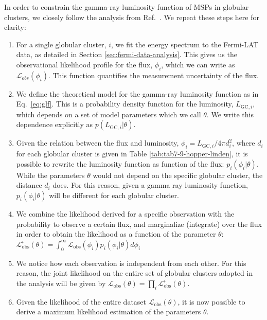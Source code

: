 \documentclass[a4paper,11pt]{article}
\begin{document}
In order to constrain the gamma-ray luminosity function of MSPs in globular clusters, we closely follow the analysis from Ref.~\cite{Hooper:2016rap}. 
We repeat these steps here for clarity:
\begin{enumerate}
    \item For a single globular cluster, $i$, we fit the energy spectrum to the Fermi-LAT data, as detailed in Section \ref{sec:fermi-data-analysis}. This gives us the observational likelihood profile for the flux, $\phi_i$, which we can write as $\mathcal{L}_{obs}(\phi_i)$. This function quantifies the measurement uncertainty of the flux.
    \item  We define the theoretical model for the gamma-ray luminosity function as in Eq.~\ref{eq:glf}. This is a probability density function  for the luminosity, $L_{\textrm{GC}, i}$, which depends on a set of model parameters which we call $\theta$.  We write this dependence explicitly as $p(L_{\textrm{GC}, i}|\theta)$.
    \item Given the relation between the flux and luminosity, $\phi_i = L_{\textrm{GC},i}/4\pi d_i^2$, where $d_i$ for each globular cluster is given in Table \ref{tab:tab7-9-hopper-linden}, it is possible to rewrite the luminosity function as function of the flux: $p_i(\phi_i|\theta)$. While the parameters $\theta$ would not depend on the specific globular cluster, the distance $d_i$ does. For this reason, given a gamma ray luminosity function, $p_i(\phi_i|\theta)$ will be different for each globular cluster.
    \item We combine the likelihood derived for a specific observation with the probability to observe a certain flux, and marginalize (integrate) over the flux in order to obtain the likelihood as a function of the parameter $\theta$: $\mathcal{L}_\textrm{obs}^i(\theta)=\int_0^\infty \mathcal{L}_\textrm{obs}(\phi_i)p_i(\phi_i|\theta)d\phi_i$
    \item We notice how each observation is independent from each other. For this reason, the joint likelihood on the entire set of globular clusters adopted in the analysis will be given by $\mathcal{L}_\textrm{obs}(\theta)=\prod_i \mathcal{L}_\textrm{obs}^i(\theta)$.
    \item Given the likelihood of the entire dataset $\mathcal{L}_\textrm{obs}(\theta)$, it is now possible to derive a maximum likelihood estimation of the parameters $\theta$.
\end{enumerate}
\end{document}
